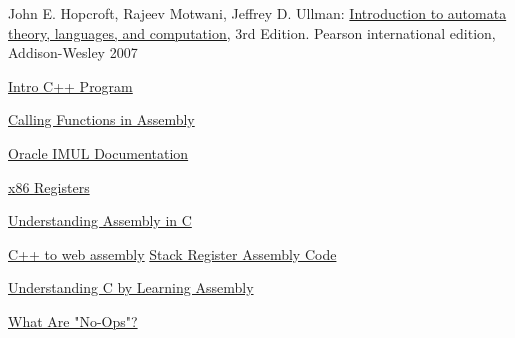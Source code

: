\documentclass{article}
\theoremstyle{theorem}
\theoremstyle{definition}
\theoremstyle{remark}
\begin{document}
\begin{thebibliography}{99}
	John E. Hopcroft, Rajeev Motwani, Jeffrey D. Ullman:
\href{http://ce.sharif.edu/courses/94-95/1/ce414-2/resources/root/Text%20Books/Automata/John%20E.%20Hopcroft,%20Rajeev%20Motwani,%20Jeffrey%20D.%20Ullman-Introduction%20to%20Automata%20Theory,%20Languages,%20and%20Computations-Prentice%20Hall%20(2006).pdf}{Introduction to automata theory, languages, and computation,} 3rd Edition. Pearson international edition, Addison-Wesley 2007

 \href{https://www.programiz.com/cpp-programming/examples/prime-number}{Intro C++ Program}

\href{https://www.cs.uaf.edu/2015/fall/cs301/lecture/09_14_call.html}{Calling Functions in Assembly}

\href{https://docs.oracle.com/cd/E19455-01/806-3773/instructionset-39/index.html#:~:text=The%20single%2Doperand%20form%20of,or%20EDX%3AEAX%20register%20respectively.}{Oracle IMUL Documentation}

\href{https://www.eecg.utoronto.ca/~amza/www.mindsec.com/files/x86regs.html#:~:text=ES%3AEDI%20EDI%20DI%20%3A%20Destination,ESP%20ESP%20SP%20%3A%20Stack%20pointer}{x86 Registers}

\href{https://stackoverflow.com/questions/45375282/understanding-c-program-in-assembly}{Understanding Assembly in C}


\href{https://godbolt.org/}{C++ to web assembly}
\href{https://blog.holbertonschool.com/hack-virtual-memory-stack-registers-assembly-code/#:~:text=The%20first%20lines%20of%20the,of%20the%20current%20stack%20frame.}{Stack Register Assembly Code}

\href{https://www.recurse.com/blog/7-understanding-c-by-learning-assembly}{Understanding C by Learning Assembly}


\href{https://www.techopedia.com/definition/11989/no-operation-nop#:~:text=No%20Operation%20(NOP)-,What%20Does%20No%20Operation%20(NOP)%20Mean%3F,a%20blank%20instruction%20or%20placeholder.}{What Are "No-Ops"?}
\end{thebibliography}
\end{document}
